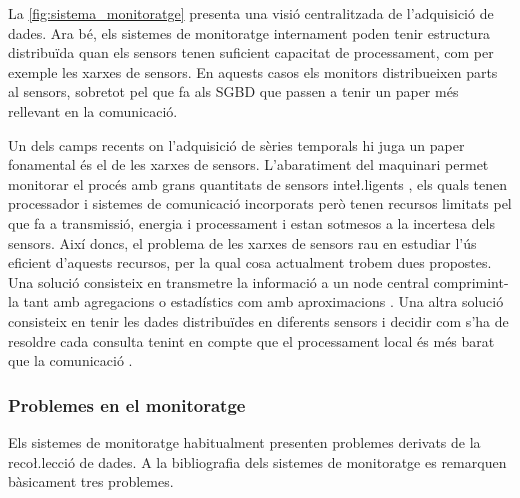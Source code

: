 La \autoref{fig:sistema_monitoratge} presenta una visió centralitzada
de l'adquisició de dades. Ara bé, els sistemes de monitoratge
internament poden tenir estructura distribuïda quan els sensors tenen
suficient capacitat de processament, com per exemple les xarxes de
sensors. En aquests casos els monitors distribueixen parts al sensors,
sobretot pel que fa als \gls{SGBD} que passen a tenir un paper més
rellevant en la comunicació.


Un dels camps recents on l'adquisició de sèries temporals hi juga un
paper fonamental és el de les xarxes de sensors. L'abaratiment del
maquinari permet monitorar el procés amb grans quantitats de sensors
inte\l.ligents \parencite{jainagrawal05,yaogehrke02}, els quals tenen
processador i sistemes de comunicació incorporats però tenen recursos
limitats pel que fa a transmissió, energia i processament i estan
sotmesos a la incertesa dels sensors. Així doncs, el problema de les
xarxes de sensors rau en estudiar l'ús eficient d'aquests recursos,
per la qual cosa actualment trobem dues propostes.  Una solució
consisteix en transmetre la informació a un node central comprimint-la
tant amb agregacions o estadístics com amb
aproximacions \parencite{deligiannakis07}.  Una altra solució
consisteix en tenir les dades distribuïdes en diferents sensors i
decidir com s'ha de resoldre cada consulta tenint en compte que el
processament local és més barat que la
comunicació \parencite{yaogehrke02,gehrkemadden04,bonnet01,kim12:aggregate_sensor_networks}.



\subsubsection{Problemes en el monitoratge}
\label{sec:art:problemes}

Els sistemes de monitoratge habitualment presenten problemes derivats
de la reco\l.lecció de dades. A la bibliografia dels sistemes de
monitoratge es remarquen bàsicament tres problemes.


